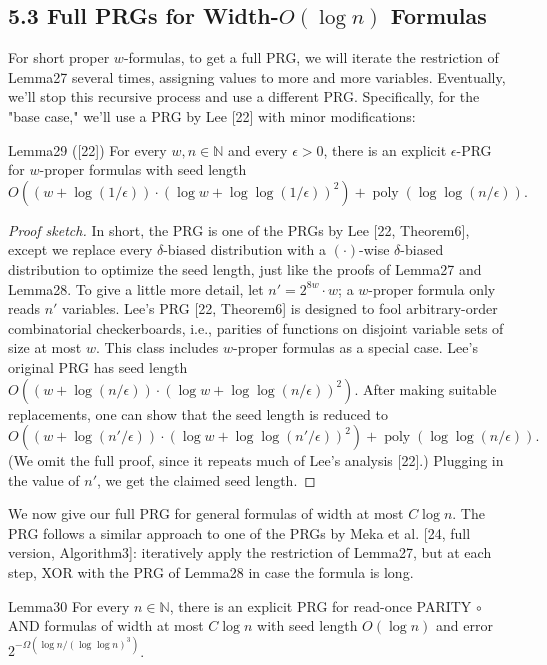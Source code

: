 \subsection*{5.3 Full PRGs for Width-$O(\log n)$ Formulas}
For short proper $w$-formulas, to get a full PRG, we will iterate the restriction of Lemma27 several times, assigning values to more and more variables. Eventually, we'll stop this recursive process and use a different PRG. Specifically, for the "base case," we'll use a PRG by Lee [22] with minor modifications:
\begin{authorclaim}{Lemma29 ([22])}
For every $w,n\in\mathbb N$ and every $\epsilon>0$, there is an explicit $\epsilon$-PRG for $w$-proper formulas with seed length
\[
O((w+\log(1/\epsilon))\cdot(\log w+\log\log(1/\epsilon))^2)
+\operatorname{poly}(\log\log(n/\epsilon)).
\]
\end{authorclaim}
\begin{proof}[Proof sketch]
In short, the PRG is one of the PRGs by Lee [22, Theorem6], except we replace every $\delta$-biased distribution with a $(\cdot)$-wise $\delta$-biased distribution to optimize the seed length, just like the proofs of Lemma27 and Lemma28.
To give a little more detail, let $n'=2^{8w}\cdot w$; a $w$-proper formula only reads $n'$ variables. Lee's PRG [22, Theorem6] is designed to fool arbitrary-order combinatorial checkerboards, i.e., parities of functions on disjoint variable sets of size at most $w$. This class includes $w$-proper formulas as a special case. Lee's original PRG has seed length $O((w+\log(n/\epsilon))\cdot(\log w+\log\log(n/\epsilon))^2)$.
After making suitable replacements, one can show that the seed length is reduced to
\[
O((w+\log(n'/\epsilon))\cdot(\log w+\log\log(n'/\epsilon))^2)
+\operatorname{poly}(\log\log(n/\epsilon)).
\]
(We omit the full proof, since it repeats much of Lee's analysis [22].) Plugging in the value of $n'$, we get the claimed seed length.
\end{proof}
We now give our full PRG for general formulas of width at most $C\log n$. The PRG follows a similar approach to one of the PRGs by Meka et al. [24, full version, Algorithm3]: iteratively apply the restriction of Lemma27, but at each step, XOR with the PRG of Lemma28 in case the formula is long.
\begin{authorclaim}{Lemma30}
For every $n\in\mathbb N$, there is an explicit PRG for read-once PARITY $\circ$ AND formulas of width at most $C\log n$ with seed length $O(\log n)$ and error $2^{-\Omega(\log n/(\log\log n)^3)}$.
\end{authorclaim}
